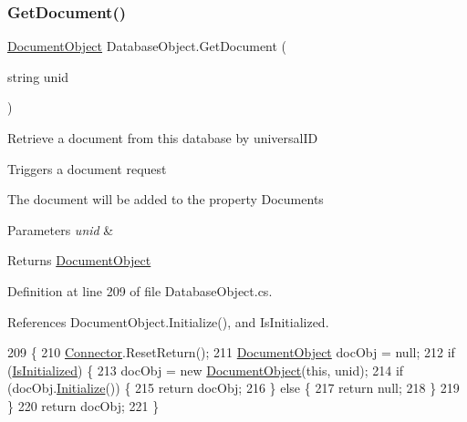 \subsubsection{\texorpdfstring{Get\+Document()}{GetDocument()}}
{\footnotesize\ttfamily \mbox{\hyperlink{class_document_object}{Document\+Object}} Database\+Object.\+Get\+Document (\begin{DoxyParamCaption}\item[{string}]{unid }\end{DoxyParamCaption})}



Retrieve a document from this database by universal\+ID 

Triggers a document request

The document will be added to the property \textquotesingle{}Documents\textquotesingle{}


\begin{DoxyParams}{Parameters}
{\em unid} & \\
\hline
\end{DoxyParams}
\begin{DoxyReturn}{Returns}
\mbox{\hyperlink{class_document_object}{Document\+Object}}
\end{DoxyReturn}


Definition at line 209 of file Database\+Object.\+cs.



References Document\+Object.\+Initialize(), and Is\+Initialized.


\begin{DoxyCode}
209                                                    \{
210         \mbox{\hyperlink{class_connector}{Connector}}.ResetReturn();
211         \mbox{\hyperlink{class_document_object}{DocumentObject}} docObj = null;
212         \textcolor{keywordflow}{if} (\mbox{\hyperlink{class_database_object_a5fe036d32a30eb10d1b3f6a30263f740}{IsInitialized}}) \{
213             docObj = \textcolor{keyword}{new} \mbox{\hyperlink{class_document_object}{DocumentObject}}(\textcolor{keyword}{this}, unid);
214             \textcolor{keywordflow}{if} (docObj.\mbox{\hyperlink{class_document_object_af4298d6cfbb9ea60643d9995309b73f1}{Initialize}}()) \{
215                 \textcolor{keywordflow}{return} docObj;
216             \} \textcolor{keywordflow}{else} \{
217                 \textcolor{keywordflow}{return} null;
218             \}
219         \}
220         \textcolor{keywordflow}{return} docObj;
221     \}
\end{DoxyCode}
\mbox{\label{class_database_object_a9be31ba852e56a107e93f7d925f8a0c3}} 

